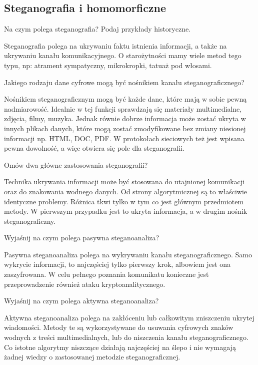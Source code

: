 \documentclass[answers,11pt]{exam}
\begin{document}
\subsection{Steganografia i homomorficzne}

\begin{questions}

\question Na czym polega steganografia? Podaj przykłady historyczne.
\begin{solution}
Steganografia polega na ukrywaniu faktu istnienia informacji, a także na ukrywaniu kanału komunikacyjnego. O starożytności mamy wiele metod tego typu, np: atrament sympatyczny, mikrokropki, tatuaż pod włosami.
\end{solution}

\question Jakiego rodzaju dane cyfrowe mogą być nośnikiem kanału steganograficznego?
\begin{solution}
Nośnikiem steganograficznym mogą być każde dane, które mają w sobie pewną nadmiarowość. Idealnie w tej funkcji sprawdzają się materiały multimedialne, zdjęcia, filmy, muzyka. Jednak równie dobrze informacja może zostać ukryta w innych plikach danych, które mogą zostać zmodyfikowane bez zmiany niesionej informacji np. HTML, DOC, PDF. W protokołach sieciowych też jest wpisana pewna dowolność, a więc otwiera się pole dla steganografii. 
\end{solution}

\question Omów dwa główne zastosowania steganografii?
\begin{solution}
Technika ukrywania informacji może być stosowana do utajnionej komunikacji oraz do znakowania wodnego danych. Od strony algorytmicznej są to właściwie identyczne problemy. Różnica tkwi tylko w tym co jest głównym przedmiotem metody. W pierwszym przypadku jest to ukryta informacja, a w drugim nośnik steganograficzny. 
\end{solution}

\question Wyjaśnij na czym polega pasywna steganoanaliza?
\begin{solution}
Pasywna steganoanaliza polega na wykrywaniu kanału steganograficznego. Samo wykrycie informacji, to najczęściej tylko pierwszy krok, albowiem jest ona zaszyfrowana. W celu pełnego poznania komunikatu konieczne jest przeprowadzenie również ataku kryptoanalitycznego.
\end{solution}

\question Wyjaśnij na czym polega aktywna steganoanaliza?
\begin{solution}
Aktywna steganoanaliza polega na zakłóceniu lub całkowitym zniszczeniu ukrytej wiadomości. Metody te są wykorzystywane do usuwania cyfrowych znaków wodnych z treści multimedialnych, lub do niszczenia kanału steganograficznego. Co istotne algorytmy niszczące działają najczęściej na ślepo i nie wymagają żadnej wiedzy o zastosowanej metodzie steganograficznej.  
\end{solution}


\end{questions}
\end{document}
